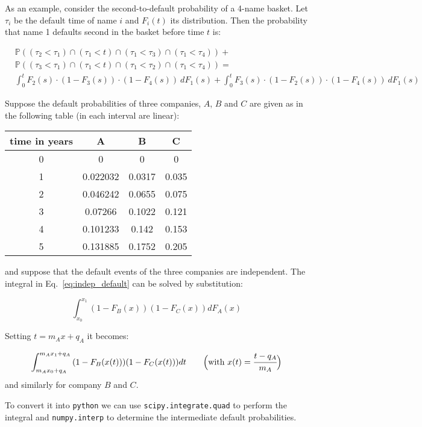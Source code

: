 As an example, consider the second-to-default probability of a 4-name
basket. Let \(\tau_i\) be the default time of name \(i\) and \(F_i(t)\)
its distribution. Then the probability that name 1 defaults second in
the basket before time \(t\) is:

\begin{equation}
\begin{split}
&\mathbb{P}((\tau_2\lt\tau_1)\cap (\tau_1\lt t)\cap (\tau_1\lt\tau_3)\cap (\tau_1\lt\tau_4)) +\\
&\mathbb{P}((\tau_3\lt\tau_1)\cap (\tau_1\lt t)\cap (\tau_1\lt\tau_2)\cap (\tau_1\lt\tau_4)) =\\
&\int_0^t{F_2 (s)\cdot (1-F_3 (s)) \cdot (1-F_4 (s))~dF_1(s)} +  \int_0^t{F_3 (s)\cdot (1-F_2 (s)) \cdot (1-F_4 (s))~dF_1(s)}
\end{split}
\label{eq:indep_default}
\end{equation}

Suppose the default probabilities of three companies, $A$, $B$ and $C$ are
given as in the following table (in each interval are linear):

\begin{center}
	\begin{tabular}{|c|c|c|c|}
		time in years & A & B & C \\
		\hline
		0 & 0 & 0 & 0 \\
		1 & 0.022032 & 0.0317 & 0.035 \\
		2 & 0.046242 & 0.0655 & 0.075 \\
		3 & 0.07266 & 0.1022 & 0.121 \\
		4 & 0.101233 & 0.142 & 0.153 \\
		5 & 0.131885 & 0.1752 & 0.205 \\
	\end{tabular}
\end{center}
and suppose that the default events of the three companies are
independent. The integral in Eq.~\ref{eq:indep_default} can be solved by substitution:

\[ \int_{x_0}^{x_1}{(1-F_B(x))(1-F_C(x))dF_A(x)}\]

Setting \(t=m_A x + q_A\) it becomes:

\[ \int_{m_A x_0 + q_A}^{m_A x_1 + q_A}{(1-F_B(x(t)))(1-F_C(x(t)))dt}~~~~~~\Big(\textrm{with}~x(t) = \cfrac{t -q_A}{m_A}\Big) \]
and similarly for company $B$ and $C$.

To convert it into \texttt{python} we can use \texttt{scipy.integrate.quad} to
perform the integral and \texttt{numpy.interp} to determine the
intermediate default probabilities.

